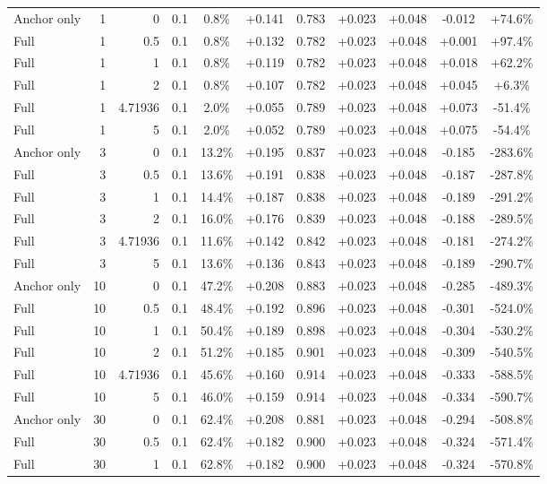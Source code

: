 \begin{table}[htbp]
\begin{tabular}{lrrrccccccc}
Anchor only & 1 & 0 & 0.1 & 0.8\% & +0.141 & 0.783 & +0.023 & +0.048 & -0.012 & +74.6\% \\
Full & 1 & 0.5 & 0.1 & 0.8\% & +0.132 & 0.782 & +0.023 & +0.048 & +0.001 & +97.4\% \\
Full & 1 & 1 & 0.1 & 0.8\% & +0.119 & 0.782 & +0.023 & +0.048 & +0.018 & +62.2\% \\
Full & 1 & 2 & 0.1 & 0.8\% & +0.107 & 0.782 & +0.023 & +0.048 & +0.045 & +6.3\% \\
Full & 1 & 4.71936 & 0.1 & 2.0\% & +0.055 & 0.789 & +0.023 & +0.048 & +0.073 & -51.4\% \\
Full & 1 & 5 & 0.1 & 2.0\% & +0.052 & 0.789 & +0.023 & +0.048 & +0.075 & -54.4\% \\
Anchor only & 3 & 0 & 0.1 & 13.2\% & +0.195 & 0.837 & +0.023 & +0.048 & -0.185 & -283.6\% \\
Full & 3 & 0.5 & 0.1 & 13.6\% & +0.191 & 0.838 & +0.023 & +0.048 & -0.187 & -287.8\% \\
Full & 3 & 1 & 0.1 & 14.4\% & +0.187 & 0.838 & +0.023 & +0.048 & -0.189 & -291.2\% \\
Full & 3 & 2 & 0.1 & 16.0\% & +0.176 & 0.839 & +0.023 & +0.048 & -0.188 & -289.5\% \\
Full & 3 & 4.71936 & 0.1 & 11.6\% & +0.142 & 0.842 & +0.023 & +0.048 & -0.181 & -274.2\% \\
Full & 3 & 5 & 0.1 & 13.6\% & +0.136 & 0.843 & +0.023 & +0.048 & -0.189 & -290.7\% \\
Anchor only & 10 & 0 & 0.1 & 47.2\% & +0.208 & 0.883 & +0.023 & +0.048 & -0.285 & -489.3\% \\
Full & 10 & 0.5 & 0.1 & 48.4\% & +0.192 & 0.896 & +0.023 & +0.048 & -0.301 & -524.0\% \\
Full & 10 & 1 & 0.1 & 50.4\% & +0.189 & 0.898 & +0.023 & +0.048 & -0.304 & -530.2\% \\
Full & 10 & 2 & 0.1 & 51.2\% & +0.185 & 0.901 & +0.023 & +0.048 & -0.309 & -540.5\% \\
Full & 10 & 4.71936 & 0.1 & 45.6\% & +0.160 & 0.914 & +0.023 & +0.048 & -0.333 & -588.5\% \\
Full & 10 & 5 & 0.1 & 46.0\% & +0.159 & 0.914 & +0.023 & +0.048 & -0.334 & -590.7\% \\
Anchor only & 30 & 0 & 0.1 & 62.4\% & +0.208 & 0.881 & +0.023 & +0.048 & -0.294 & -508.8\% \\
Full & 30 & 0.5 & 0.1 & 62.4\% & +0.182 & 0.900 & +0.023 & +0.048 & -0.324 & -571.4\% \\
Full & 30 & 1 & 0.1 & 62.8\% & +0.182 & 0.900 & +0.023 & +0.048 & -0.324 & -570.8\% \\

\end{tabular}
\end{table}
